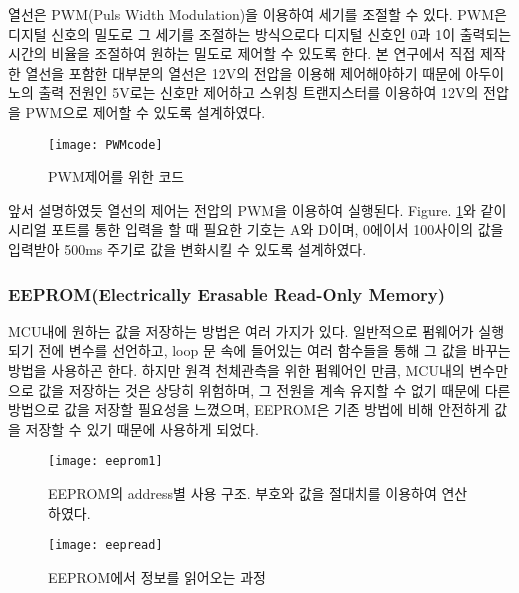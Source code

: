 열선은 PWM(Puls Width Modulation)을 이용하여 세기를 조절할 수 있다. PWM은 디지털 신호의 밀도로 그 세기를 조절하는 방식으로다 디지털 신호인 0과 1이 출력되는 시간의 비율을 조절하여 원하는 밀도로 제어할 수 있도록 한다. 본 연구에서 직접 제작한 열선을 포함한 대부분의 열선은 12V의 전압을 이용해 제어해야하기 때문에 아두이노의 출력 전원인 5V로는 신호만 제어하고 스위칭 트랜지스터를 이용하여 12V의 전압을 PWM으로 제어할 수 있도록 설계하였다.


\begin{figure}[ht]
	\begin{center}
		\texttt{[image: PWMcode]}
	\end{center}
	\caption{PWM제어를 위한 코드}
	\label{PWM}
\end{figure}


앞서 설명하였듯 열선의 제어는 전압의 PWM을 이용하여 실행된다. \textrm{Figure}. \ref{PWM}와 같이 시리얼 포트를 통한 입력을 할 때 필요한 기호는 A와 D이며, 0에이서 100사이의 값을 입력받아 500ms 주기로 값을 변화시킬 수 있도록 설계하였다.

\subsubsection{EEPROM(Electrically Erasable Read-Only Memory)}

MCU내에 원하는 값을 저장하는 방법은 여러 가지가 있다. 일반적으로 펌웨어가 실행되기 전에 변수를 선언하고, loop 문 속에 들어있는 여러 함수들을 통해 그 값을 바꾸는 방법을 사용하곤 한다. 하지만 원격 천체관측을 위한 펌웨어인 만큼, MCU내의 변수만으로 값을 저장하는 것은 상당히 위험하며, 그 전원을 계속 유지할 수 없기 때문에 다른 방법으로 값을 저장할 필요성을 느꼈으며, EEPROM은 기존 방법에 비해 안전하게 값을 저장할 수 있기 때문에 사용하게 되었다.


\begin{figure}[h]
	\begin{center}
		\texttt{[image: eeprom1]}
	\end{center}
	\caption{EEPROM의 address별 사용 구조. 부호와 값을 절대치를 이용하여 연산하였다.}
	\label{eeprom1}
\end{figure}


\begin{figure}[ht]
	\begin{center}
		\texttt{[image: eepread]}
	\end{center}
	\caption{EEPROM에서 정보를 읽어오는 과정}
	\label{eepread}
\end{figure}

